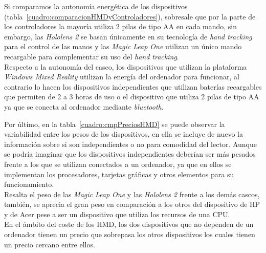 Si comparamos la autonomía energética de los dispositivos (tabla~\ref{cuadro:comparacionHMDyControladores}), sobresale que por la parte de los controladores la mayoría utiliza 2 pilas de tipo AA en cada mando, sin embargo, las \textit{Hololens 2} se basan únicamente en su tecnología de \textit{hand tracking} para el control de las manos y las \textit{Magic Leap One} utilizan un único mando recargable para complementar su uso del \textit{hand tracking}.\\

Respecto a la autonomía del casco, los dispositivos que utilizan la plataforma \textit{Windows Mixed Reality} utilizan la energía del ordenador para funcionar, al contrario lo hacen los dispositivos independientes que utilizan baterías recargables que permiten de 2 a 3 horas de uso o el dispositivo \textitAcer que utiliza 2 pilas de tipo AA ya que se conecta al ordenador mediante \textit{bluetooth}.\\

\begin{table}[ht]
\centering
{}
\caption{Pesos y precios de los dispositivos. }
\label{cuadro:cmpPreciosHMD}
\end{table}


Por último, en la tabla~\ref{cuadro:cmpPreciosHMD} se puede observar la variabilidad entre los pesos de los dispositivos, en ella se incluye de nuevo la información sobre si son independientes o no para comodidad del lector. Aunque se podría imaginar que los dispositivos independientes deberían ser más pesados frente a los que se utilizan conectados a un ordenador, ya que en ellos se implementan los procesadores, tarjetas gráficas y otros elementos para su funcionamiento.\\ 

Resalta el peso de las \textit{Magic Leap One} y las \textit{Hololens 2} frente a los demás cascos, también, se aprecia el gran peso en comparación a los otros del dispositivo de HP y de Acer pese a ser un dispositivo que utiliza los recursos de una CPU.\\

En el ámbito del coste de los HMD, los dos dispositivos que no dependen de un ordenador tienen un precio que sobrepasa los otros dispositivos los cuales tienen un precio cercano entre ellos.